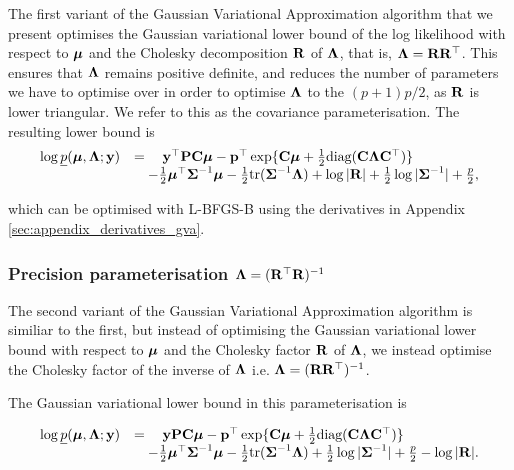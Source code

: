 The first variant of the Gaussian Variational Approximation algorithm that we
present optimises the Gaussian variational lower bound of the log likelihood
with respect to ${\boldsymbol \mu}$ and the Cholesky decomposition ${\bf R}$ of ${\boldsymbol \Lambda}$, that
is, ${\boldsymbol \Lambda} = {\bf R} {\bf R}^\top$. This ensures that ${\boldsymbol \Lambda}$ remains positive
definite, and reduces the number of parameters we have to optimise over in
order to optimise ${\boldsymbol \Lambda}$ to the $(p + 1) p / 2$, as ${\bf R}$ is lower
triangular.	We refer to this as the covariance parameterisation. The resulting
lower bound is
\begin{equation}
\label{eq:gva_lower_bound_cov_param}
\begin{array}{ll}
	\log \underline{p}({\boldsymbol \mu}, {\boldsymbol \Lambda}; {\bf y}) & = \quad {\bf y}^\top{\bf P} {\bf C} {\boldsymbol\mu} - {\bf p}^\top \exp\{{\bf C} {\boldsymbol \mu} + \tfrac{1}{2} \text{diag}({\bf C} {\boldsymbol \Lambda} {\bf C}^\top)\} \\
	& \quad - \tfrac{1}{2} {\boldsymbol \mu}^\top {\boldsymbol\Sigma}^{-1} {\boldsymbol \mu} - \tfrac{1}{2} \text{tr}{({\boldsymbol\Sigma}^{-1} {\boldsymbol\Lambda})} + \log{|{\bf R}|}
	                                        + \tfrac{1}{2} \log{|{\boldsymbol\Sigma}^{-1}|} + \tfrac{p}{2},                                                                              
\end{array}
\end{equation}

\noindent which can be optimised with L-BFGS-B using the derivatives in
Appendix \ref{sec:appendix_derivatives_gva}.
	
\subsubsection{Precision parameterisation ${\boldsymbol \Lambda} = ({\bf R}^\top {\bf R})^{-1}$}
		
\noindent The second variant of the Gaussian Variational Approximation
algorithm is similiar to the first, but instead of optimising the Gaussian
variational lower bound with respect to ${\boldsymbol \mu}$ and the Cholesky factor ${\bf R}$ of
${\boldsymbol \Lambda}$, we instead optimise the Cholesky factor of the inverse of
${\boldsymbol \Lambda}$ i.e. ${\boldsymbol \Lambda} = ({\bf R} {\bf R}^\top)^{-1}$.

The Gaussian variational lower bound in this parameterisation is

\begin{equation}
\label{eq:gva_lower_bound_precision_param}
\begin{array}{ll}
	\log \underline{p}({\boldsymbol \mu}, {\boldsymbol \Lambda}; {\bf y}) & = \quad {\bf y}{\bf P}{\bf C} {\boldsymbol\mu} - {\bf p}^\top \exp\{{\bf C} {\boldsymbol \mu} + \tfrac{1}{2} \text{diag}({\bf C} {\boldsymbol \Lambda} {\bf C}^\top)\} \\
	&\quad - \tfrac{1}{2} {\boldsymbol \mu}^\top {\boldsymbol\Sigma}^{-1} {\boldsymbol \mu} - \tfrac{1}{2} \text{tr}{({\boldsymbol\Sigma}^{-1} {\boldsymbol\Lambda})}
        + \tfrac{1}{2} \log{|{\boldsymbol\Sigma}^{-1}|} + \tfrac{p}{2} - \log{|{\bf R}|}.
\end{array}
\end{equation}
		
